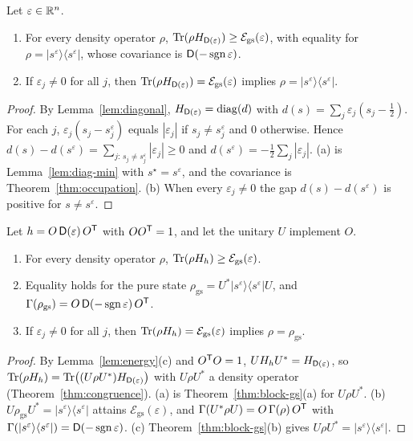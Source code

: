 \begin{theorem}\label{thm:block-gs}
Let $\varepsilon\in\mathbb R^n$.
\begin{enumerate}
\item[(a)] For every density operator $\rho$, $\operatorname{Tr}(\rho H_{\mathsf D(\varepsilon)})\geq \mathcal E_{\mathrm{gs}}(\varepsilon)$,
with equality for $\rho=|s^\varepsilon\rangle\langle s^\varepsilon|$, whose covariance is
$\mathsf D(-\operatorname{sgn}\varepsilon)$.
\item[(b)] If $\varepsilon_j\neq0$ for all $j$, then $\operatorname{Tr}(\rho H_{\mathsf D(\varepsilon)})=\mathcal E_{\mathrm{gs}}(\varepsilon)$
implies $\rho=|s^\varepsilon\rangle\langle s^\varepsilon|$.
\end{enumerate}
\end{theorem}
\begin{proof}
By Lemma~\ref{lem:diagonal}, $H_{\mathsf D(\varepsilon)}=\operatorname{diag}(d)$ with
$d(s)=\sum_j\varepsilon_j(s_j-\tfrac12)$. For each $j$, $\varepsilon_j(s_j-s^\varepsilon_j)$
equals $|\varepsilon_j|$ if $s_j\neq s^\varepsilon_j$ and $0$ otherwise. Hence
$d(s)-d(s^\varepsilon)=\sum_{j:\,s_j\neq s^\varepsilon_j}|\varepsilon_j|\geq0$ and
$d(s^\varepsilon)=-\tfrac12\sum_j|\varepsilon_j|$. (a) is Lemma~\ref{lem:diag-min} with
$s^\star=s^\varepsilon$, and the covariance is Theorem~\ref{thm:occupation}. (b) When every
$\varepsilon_j\neq0$ the gap $d(s)-d(s^\varepsilon)$ is positive for $s\neq s^\varepsilon$.
\end{proof}

\begin{theorem}\label{thm:rotated-gs}
Let $h=O\,\mathsf D(\varepsilon)\,O^{\mathsf T}$ with $OO^{\mathsf T}=1$, and let the unitary $U$ implement $O$.
\begin{enumerate}
\item[(a)] For every density operator $\rho$, $\operatorname{Tr}(\rho H_h)\geq \mathcal E_{\mathrm{gs}}(\varepsilon)$.
\item[(b)] Equality holds for the pure state
$\rho_{\mathrm{gs}}=U^*|s^\varepsilon\rangle\langle s^\varepsilon|U$, and
$\Gamma(\rho_{\mathrm{gs}})=O\,\mathsf D(-\operatorname{sgn}\varepsilon)\,O^{\mathsf T}$.
\item[(c)] If $\varepsilon_j\neq0$ for all $j$, then $\operatorname{Tr}(\rho H_h)=\mathcal E_{\mathrm{gs}}(\varepsilon)$ implies
$\rho=\rho_{\mathrm{gs}}$.
\end{enumerate}
\end{theorem}
\begin{proof}
By Lemma~\ref{lem:energy}(c) and $O^{\mathsf T}O=1$, $UH_hU^*=H_{\mathsf D(\varepsilon)}$, so
$\operatorname{Tr}(\rho H_h)=\operatorname{Tr}\bigl((U\rho U^*)H_{\mathsf D(\varepsilon)}\bigr)$ with $U\rho U^*$ a density operator
(Theorem~\ref{thm:congruence}). (a) is Theorem~\ref{thm:block-gs}(a) for $U\rho U^*$.
(b) $U\rho_{\mathrm{gs}}U^*=|s^\varepsilon\rangle\langle s^\varepsilon|$ attains $\mathcal E_{\mathrm{gs}}(\varepsilon)$, and
$\Gamma(U^*\rho U)=O\,\Gamma(\rho)\,O^{\mathsf T}$ with
$\Gamma(|s^\varepsilon\rangle\langle s^\varepsilon|)=\mathsf D(-\operatorname{sgn}\varepsilon)$. (c)
Theorem~\ref{thm:block-gs}(b) gives $U\rho U^*=|s^\varepsilon\rangle\langle s^\varepsilon|$.
\end{proof}

